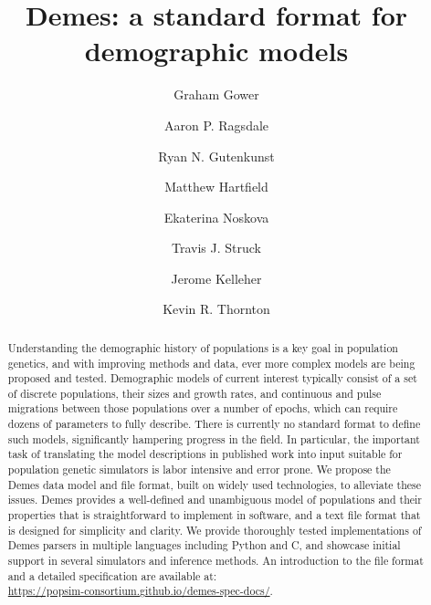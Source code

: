 \documentclass[11pt]{article}
\begin{document}
\title{Demes: a standard format for demographic models}
\author[1,$\star$]{Graham Gower}
\author[2,$\star$]{Aaron P. Ragsdale}

\author[3]{Ryan N. Gutenkunst}
\author[4]{Matthew Hartfield}
\author[5]{Ekaterina Noskova}
\author[3]{Travis J. Struck}
\author[6,$\dagger$,$\aleph$]{Jerome Kelleher}
\author[7,$\dagger$]{Kevin R. Thornton}




\maketitle

\begin{abstract}
Understanding the demographic history of populations is a
key goal in population genetics, and with improving methods
and data, ever more complex models are being proposed and tested.
Demographic models of current interest
typically consist of a set of discrete populations,
their sizes and growth rates, and continuous and pulse migrations
between those populations over a number of epochs, which can require
dozens of parameters to fully describe. There is currently
no standard format to define such models, significantly
hampering  progress in the field. In particular, the important
task of translating the model descriptions in published
work into input suitable for population genetic simulators is labor intensive
and error prone.
We propose the Demes data model and file format,
built on widely used technologies,
to alleviate these issues. Demes provides a well-defined and unambiguous
model of populations and their properties that is straightforward to
implement in software, and a text file format that is designed for
simplicity and clarity.
We provide thoroughly tested implementations of Demes parsers
in multiple languages including Python and C,
and showcase initial support in several simulators and inference
methods.
An introduction to the file format and a detailed specification are available at:\\
\url{https://popsim-consortium.github.io/demes-spec-docs/}.
\end{abstract}
\end{document}
